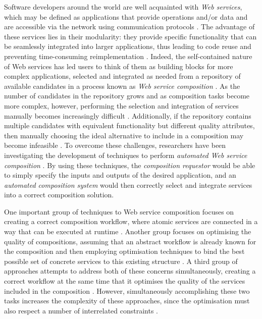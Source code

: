 \documentclass{llncs}
\begin{document}
Software developers around the world are well acquainted with \textit{Web services}, which may be defined as applications that provide operations and/or data and are accessible via the network using communication protocols \cite{gottschalk2002introduction}. The advantage of these services lies in their modularity: they provide specific functionality that can be seamlessly integrated into larger applications, thus leading to code reuse and preventing time-consuming reimplementation \cite{dustdar2008services}. Indeed, the self-contained nature of Web services has led users to think of them as building blocks for more complex applications, selected and integrated as needed from a repository of available candidates in a process known as \textit{Web service composition} \cite{dustdar2008services}. As the number of candidates in the repository grows and as composition tasks become more complex, however, performing the selection and integration of services manually becomes increasingly difficult \cite{lecue2006formal}. Additionally, if the repository contains multiple candidates with equivalent functionality but different quality attributes, then manually choosing the ideal alternative to include in a composition may become infeasible \cite{gronmo2005model}. To overcome these challenges, researchers have been investigating the development of techniques to perform \textit{automated Web service composition} \cite{milanovic2004current}. By using these techniques, the \textit{composition requestor} would be able to simply specify the inputs and outputs of the desired application, and an \textit{automated composition system} would then correctly select and integrate services into a correct composition solution.

One important group of techniques to Web service composition focuses on creating a correct composition workflow, where atomic services are connected in a way that can be executed at runtime \cite{}. Another group focuses on optimising the quality of compositions, assuming that an abstract workflow is already known for the composition and then employing optimisation techniques to bind the best possible set of concrete services to this existing structure \cite{}. A third group of approaches attempts to address both of these concerns simultaneously, creating a correct workflow at the same time that it optimises the quality of the services included in the composition \cite{da2015graphevol}. However, simultaneously accomplishing these two tasks increases the complexity of these approaches, since the optimisation must also respect a number of interrelated constraints \cite{venkatraman2005generic}.
\end{document}
